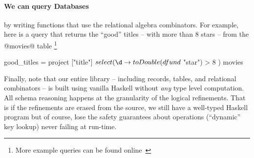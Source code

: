 
\paragraph{We can query Databases} by writing functions 
that use the relational algebra combinators. 
%
For example, here is a query that returns the 
``good'' titles -- with more than 8 stars -- 
from the @movies@ table
\footnote{More example queries can be found online~\cite{liquidhaskellgithub}}
%
\begin{code}
  good_titles = project ["title"] $ select (\d ->
                  toDouble (dfun d $ "star") > 8
                ) movies
\end{code}
%
%

Finally, note that our entire library -- including 
records, tables, and relational combinators -- is 
built using vanilla Haskell \ie without \emph{any} 
type level computation. 
%
All schema reasoning happens at the granularity of 
the logical refinements. That is if the refinements
are erased from the source, we still have a well-typed
Haskell program but of course, lose the safety 
guarantees about operations (\eg ``dynamic'' key lookup) 
never failing at run-time.


 

